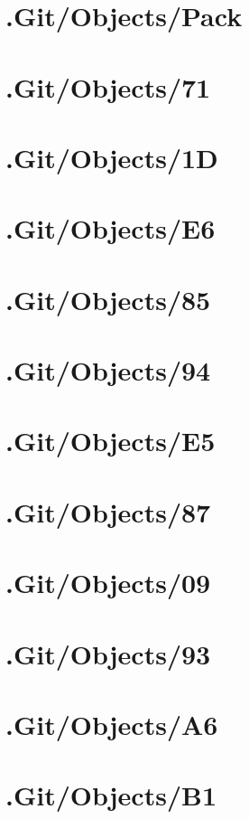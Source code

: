 \section*{.Git/Objects/Pack}

\section*{.Git/Objects/71}

\section*{.Git/Objects/1D}

\section*{.Git/Objects/E6}

\section*{.Git/Objects/85}

\section*{.Git/Objects/94}

\section*{.Git/Objects/E5}

\section*{.Git/Objects/87}

\section*{.Git/Objects/09}

\section*{.Git/Objects/93}

\section*{.Git/Objects/A6}

\section*{.Git/Objects/B1}

